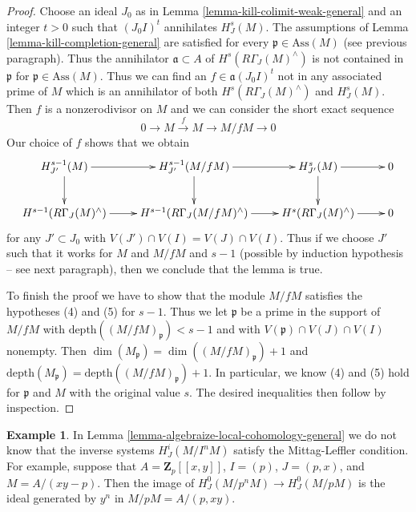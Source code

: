 \documentclass{stacks-project}
\theoremstyle{plain}
\theoremstyle{definition}
\newtheorem{example}[subsection]{Example}
\theoremstyle{remark}
\numberwithin{equation}{subsection}
\begin{document}
\begin{proof}
\medskip\noindent
Choose an ideal $J_0$ as in Lemma \ref{lemma-kill-colimit-weak-general}
and an integer $t > 0$ such that $(J_0I)^t$ annihilates $H^s_J(M)$.
The assumptions of Lemma \ref{lemma-kill-completion-general}
are satisfied for every $\mathfrak p \in \text{Ass}(M)$
(see previous paragraph).
Thus the annihilator $\mathfrak a \subset A$ of
$H^s(R\Gamma_J(M)^\wedge)$
is not contained in $\mathfrak p$ for $\mathfrak p \in \text{Ass}(M)$.
Thus we can find an $f \in \mathfrak a(J_0I)^t$
not in any associated prime of $M$ which is an annihilator
of both $H^s(R\Gamma_J(M)^\wedge)$ and $H^s_J(M)$.
Then $f$ is a nonzerodivisor on $M$ and we can consider the
short exact sequence
$$
0 \to M \xrightarrow{f} M \to M/fM \to 0
$$
Our choice of $f$ shows that we obtain
$$
\xymatrix{
H^{s - 1}_{J'}(M) \ar[d] \ar[r] &
H^{s - 1}_{J'}(M/fM) \ar[d] \ar[r] &
H^s_{J'}(M) \ar[d] \ar[r] & 0 \\
H^{s - 1}(R\Gamma_J(M)^\wedge) \ar[r] &
H^{s - 1}(R\Gamma_J(M/fM)^\wedge) \ar[r] &
H^s(R\Gamma_J(M)^\wedge) \ar[r] & 0
}
$$
for any $J' \subset J_0$ with $V(J') \cap V(I) = V(J) \cap V(I)$.
Thus if we choose $J'$ such that it works for
$M$ and $M/fM$ and $s - 1$ (possible by induction hypothesis --
see next paragraph), then we conclude that the lemma is true.

\medskip\noindent
To finish the proof we have to show that the module
$M/fM$ satisfies the hypotheses (4) and (5) for $s - 1$.
Thus we let $\mathfrak p$ be a prime in the support
of $M/fM$ with $\text{depth}((M/fM)_\mathfrak p) < s - 1$
and with $V(\mathfrak p) \cap V(J) \cap V(I)$ nonempty.
Then $\dim(M_\mathfrak p) = \dim((M/fM)_\mathfrak p) + 1$
and $\text{depth}(M_\mathfrak p) = \text{depth}((M/fM)_\mathfrak p) + 1$.
In particular, we know (4) and (5) hold for $\mathfrak p$ and $M$
with the original value $s$.
The desired inequalities then follow by inspection.
\end{proof}

\begin{example}
\label{example-no-ML}
In Lemma \ref{lemma-algebraize-local-cohomology-general}
we do not know that the inverse systems $H^i_J(M/I^nM)$ satisfy the
Mittag-Leffler condition.
For example, suppose that $A = \mathbf{Z}_p[[x, y]]$, $I = (p)$,
$J = (p, x)$, and $M = A/(xy - p)$. Then the image of
$H^0_J(M/p^nM) \to H^0_J(M/pM)$
is the ideal generated by $y^n$ in $M/pM = A/(p, xy)$.
\end{example}
\end{document}
